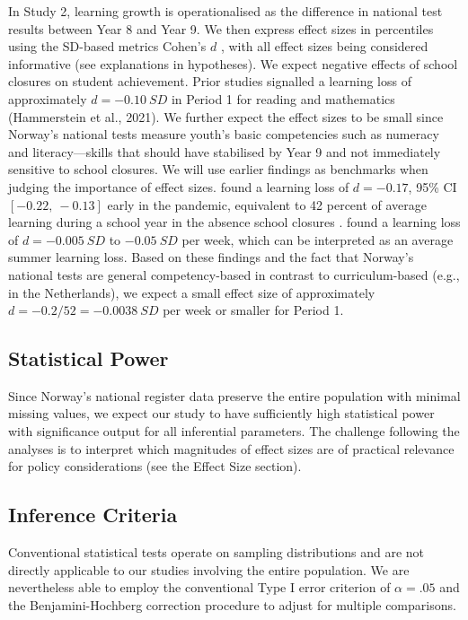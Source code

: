 In Study 2, learning growth is operationalised as the difference in national test results between Year 8 and Year 9. We then express effect sizes in percentiles using the SD-based metrics Cohen's $d$ \parencite{cohen:1988}, with all effect sizes being considered informative (see explanations in hypotheses). We expect negative effects of school closures on student achievement. Prior studies signalled a learning loss of approximately $d=-0.10\ SD$ in Period 1 for reading and mathematics (Hammerstein et al., 2021). We further expect the effect sizes to be small since Norway's national tests measure youth's basic competencies such as numeracy and literacy---skills that should have stabilised by Year 9 and not immediately sensitive to school closures. We will use earlier findings as benchmarks when judging the importance of effect sizes. \textcite{betthauser:2022} found a learning loss of $d=-0.17$, 95\% CI $[-0.22,\ -0.13]$ early in the pandemic, equivalent to 42 percent of average learning during a school year in the absence school closures \parencite[teachers typically can attain between $d=0.20$ and $d=0.40$ per year; ][]{hattie:2009}. \textcite{hammerstein:2021} found a learning loss of $d=-0.005\ SD$ to $-0.05\ SD$ per week, which can be interpreted as an average summer learning loss. Based on these findings and the fact that Norway's national tests are general competency-based in contrast to curriculum-based (e.g., in the Netherlands), we expect a small effect size of approximately $d=-0.2/52=-0.0038\ SD$ per week or smaller for Period 1.

\subsection{Statistical Power}

Since Norway's national register data preserve the entire population with minimal missing values, we expect our study to have sufficiently high statistical power with significance output for all inferential parameters. The challenge following the analyses is to interpret which magnitudes of effect sizes are of practical relevance for policy considerations (see the Effect Size section).

\subsection{Inference Criteria}

Conventional statistical tests operate on sampling distributions and are not directly applicable to our studies involving the entire population. We are nevertheless able to employ the conventional Type I error criterion of $\alpha = .05$ and the Benjamini-Hochberg correction \parencite{benjamini:1995} procedure to adjust for multiple comparisons.


